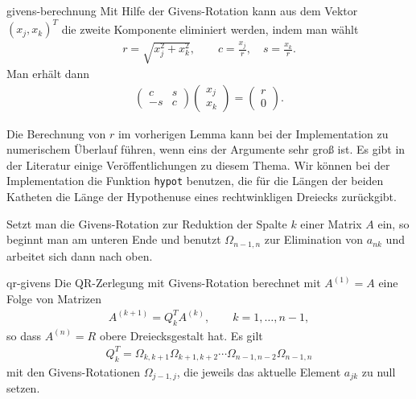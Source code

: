 \begin{Lemma}{givens-berechnung}
  Mit Hilfe der Givens-Rotation kann aus dem Vektor $(x_j,x_k)^T$ die
  zweite Komponente eliminiert werden, indem man wählt
  \begin{gather}
    r = \sqrt{x_j^2+x_k^2},\qquad
    c = \frac{x_j}r,\quad s = \frac{x_k}r.
  \end{gather}
  Man erhält dann
  \begin{gather}
    \begin{pmatrix}
      c & s \\ -s & c
    \end{pmatrix}
    \begin{pmatrix}
      x_j\\x_k
    \end{pmatrix}
    =
    \begin{pmatrix}
      r\\0
    \end{pmatrix}
    .
  \end{gather}
\end{Lemma}

\begin{remark}
  Die Berechnung von $r$ im vorherigen Lemma kann bei der
  Implementation zu numerischem Überlauf führen, wenn eins der
  Argumente sehr groß ist. Es gibt in der Literatur einige
  Veröffentlichungen zu diesem Thema. Wir können bei der
  Implementation die Funktion \lstinline!hypot! benutzen, die für die
  Längen der beiden Katheten die Länge der Hypothenuse eines
  rechtwinkligen Dreiecks zurückgibt.
\end{remark}



\begin{remark}
  Setzt man die Givens-Rotation zur Reduktion der Spalte $k$ einer
  Matrix $A$ ein, so beginnt man am unteren Ende und benutzt
  $\Omega_{n-1,n}$ zur Elimination von $a_{nk}$ und arbeitet sich dann nach oben.
\end{remark}

\begin{Lemma}{qr-givens}
  Die QR-Zerlegung mit Givens-Rotation berechnet mit $A^{(1)} = A$ eine Folge von Matrizen
  \begin{gather}
    A^{(k+1)} = Q_k^T A^{(k)}, \qquad k=1,\dots,n-1,
  \end{gather}
  so dass $A^{(n)}=R$ obere Dreiecksgestalt hat. Es gilt
  \begin{gather}
    Q_k^T = \Omega_{k,k+1}\Omega_{k+1,k+2}\cdots\Omega_{n-1,n-2}\Omega_{n-1,n}
  \end{gather}
  mit den Givens-Rotationen $\Omega_{j-1,j}$, die jeweils das aktuelle
  Element $a_{jk}$ zu null setzen.
\end{Lemma}

